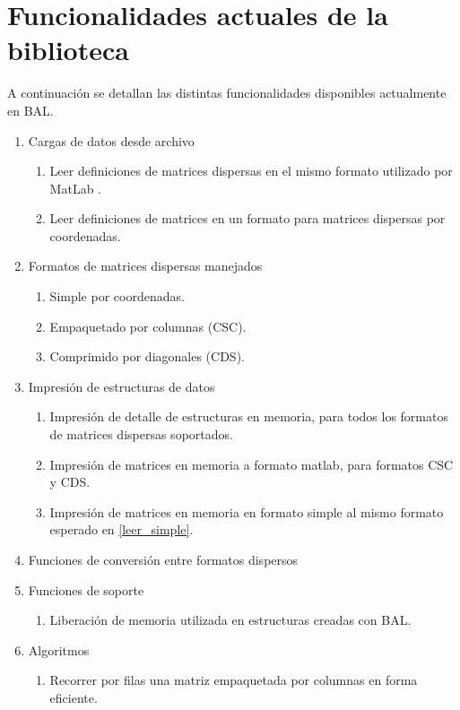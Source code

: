 \documentclass[a4paper,10pt]{article}
\begin{document}
\section{Funcionalidades actuales de la biblioteca}
\label{sec_funcionalidad}
A continuación se detallan las distintas funcionalidades disponibles actualmente en BAL.
\begin{enumerate}
 \item Cargas de datos desde archivo
 \begin{enumerate}
  \item Leer definiciones de matrices dispersas en el mismo formato utilizado por MatLab \cite{matlab}.
  \item \label{leer_simple} Leer definiciones de matrices en un formato para matrices dispersas por coordenadas. %
 \end{enumerate}
 \item Formatos de matrices dispersas manejados \cite{dongarra}
 \begin{enumerate}
  \item Simple por coordenadas.
  \item Empaquetado por columnas (CSC).
  \item Comprimido por diagonales (CDS).
 \end{enumerate}
 \item Impresión de estructuras de datos
 \begin{enumerate}
  \item Impresión de detalle de estructuras en memoria, para todos los formatos de matrices dispersas soportados.
  \item Impresión de matrices en memoria a formato matlab, para formatos CSC y CDS.
  \item Impresión de matrices en memoria en formato simple al mismo formato esperado en \ref{leer_simple}.
 \end{enumerate}
 \item Funciones de conversión entre formatos dispersos
 \item Funciones de soporte
 \begin{enumerate}
  \item Liberación de memoria utilizada en estructuras creadas con BAL.
 \end{enumerate}
 \item Algoritmos
 \begin{enumerate}
  \item Recorrer por filas una matriz empaquetada por columnas en forma eficiente.

\end{enumerate}
\end{enumerate}
\end{document}
